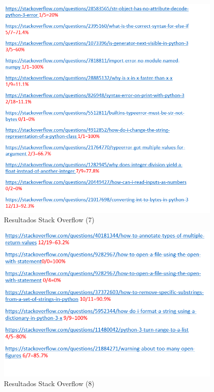 \documentclass[a4paper, 12pt]{book}
\begin{document}
\begin{figure}
	\centering
    \includegraphics[width=1\textwidth]{img/stack11}
    \caption{Resultados Stack Overflow (7)}
    \label{figura:stack11}
 \end{figure}
 
\begin{figure}
	\centering
    \includegraphics[width=1\textwidth]{img/stack12}
    \caption{Resultados Stack Overflow (8)}
    \label{figura:stack12}
 \end{figure}
 
\end{document}
